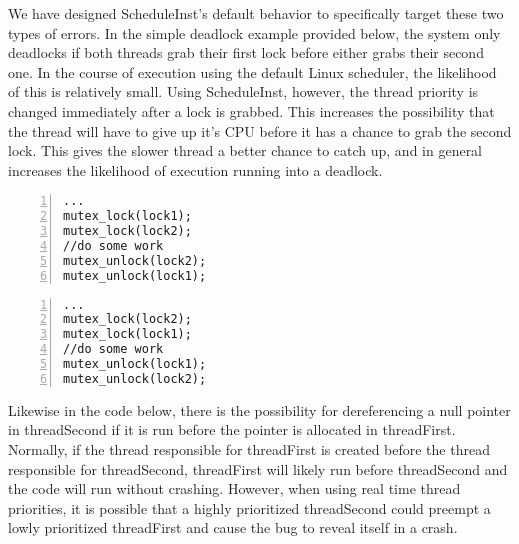 \documentclass[10pt,]{article} %
\begin{document}
We have designed ScheduleInst’s default behavior to specifically target these two types of errors.  In the simple deadlock example provided below, the system only deadlocks if both threads grab their first lock before either grabs their second one.  In the course of execution using the default Linux scheduler, the likelihood of this is relatively small.  Using ScheduleInst, however, the thread priority is changed immediately after a lock is grabbed.  This increases the possibility that the thread will have to give up it’s CPU before it has a chance to grab the second lock.  This gives the slower thread a better chance to catch up, and in general increases the likelihood of execution running into a deadlock.  

\begin{minipage}[b]{0.45\linewidth}
\centering
\lstset{language=C,label=SliceExaple}
\begin{lstlisting}[frame=single, numbers=left, mathescape,%
  title={Deadlock Thread 1}, label=scopingExample]
...
mutex_lock(lock1);
mutex_lock(lock2);
//do some work
mutex_unlock(lock2);
mutex_unlock(lock1);
\end{lstlisting}
\end{minipage}
\hspace{0.5cm}
\begin{minipage}[b]{0.45\linewidth}
\centering
\begin{lstlisting}[frame=single,numbers=left, mathescape,%
  title={Deadlock Thread 2}, label=scopesEnteredContents]
...
mutex_lock(lock2);
mutex_lock(lock1);
//do some work
mutex_unlock(lock1);
mutex_unlock(lock2);
\end{lstlisting}
\end{minipage}

Likewise in the code below, there is the possibility for dereferencing a null pointer in threadSecond if it is run before the pointer is allocated in threadFirst.  Normally, if the thread responsible for threadFirst is created before the thread responsible for threadSecond, threadFirst will likely run before threadSecond and the code will run without crashing.  However, when using real time thread priorities, it is possible that a highly prioritized threadSecond could preempt a lowly prioritized threadFirst and cause the bug to reveal itself in a crash.  
\end{document}
